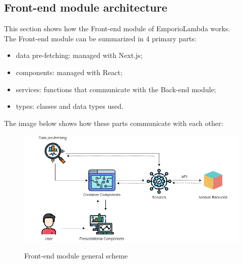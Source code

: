 \subsection{Front-end module architecture}
This section shows how the Front-end module of EmporioLambda works. \\The Front-end module can be summarized in 4 primary parts:
\begin{itemize}
\item data pre-fetching: managed with Next.js;
\item components: managed with React;
\item services: functions that communicate with the Back-end module;
\item types: classes and data types used.
\end{itemize} 
The image below shows how these parts communicate with each other:
\begin{figure}[H]
\centering
\includegraphics[scale=0.58]{res/Architettura/Frontend/img/general_frontend}\\
\caption{Front-end module general scheme}
\end{figure}


